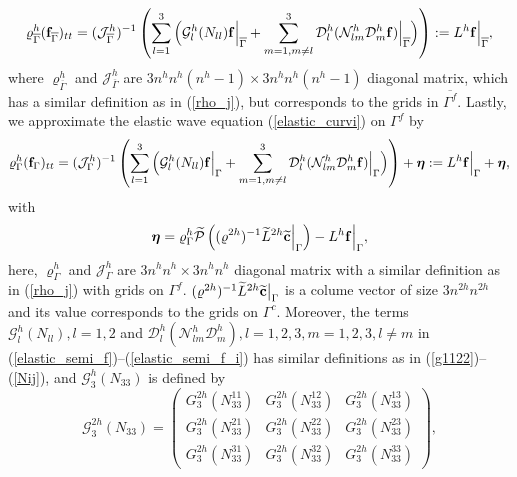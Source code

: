 \begin{equation}\label{elastic_semi_f}
\varrho^h_{\overline{\Gamma}} ({\bf f}_{\overline{\Gamma}})_{tt} =
( \mathcal{ J}_{\overline{\Gamma}}^{h})^{-1}\left(\sum_{l=1}^3\Big(\mathcal{G}_l^{h}({N}_{ll}){\bf f}\Big|_{\overline{\Gamma}}+\sum_{m=1,m\neq l}^3\mathcal{D}_l^{h}(\mathcal{N}_{lm}^{h}\mathcal{D}_m^{h}{\bf f})\Big|_{\overline{\Gamma}}\Big)\right) := L^h{\bf f}\Big|_{\overline{\Gamma}},
\end{equation}
where ${\varrho}^{h}_{\overline{\Gamma}}$ and ${\mathcal{J}}^{h}_{\overline{\Gamma}}$ are $3n^hn^h(n^h-1)\times 3n^hn^h(n^h-1)$ diagonal matrix, which has a similar definition as in (\ref{rho_j}), but corresponds to the grids in $\overline{\Gamma^f}$. Lastly, we approximate the elastic wave equation (\ref{elastic_curvi}) on $\Gamma^f$ by
\begin{equation}\label{elastic_semi_f_i}
{\varrho}^h_\Gamma ({\bf f}_\Gamma)_{tt} =
( {\mathcal{ J}}^{h}_\Gamma)^{-1}\left(\sum_{l=1}^3\Big(\mathcal{G}_l^{h}({N}_{ll}){\bf f}\Big|_\Gamma+\sum_{m=1,m\neq l}^3\mathcal{D}_l^{h}(\mathcal{N}_{lm}^{h}\mathcal{D}_m^{h}{\bf f})\Big|_\Gamma\Big) \right) + {\bm \eta} := L^h{\bf f}\Big|_\Gamma + {\bm \eta},
\end{equation}
with 
\begin{equation}\label{eta}
{\bm \eta} = {\varrho}^h_{\Gamma}\wt{\mathcal{P}}\left(({ \varrho}^{2h})^{-1}\wt{L}^{2h} \wt{{\bf c}}\Big|_{\Gamma}\right) - L^{h}{\bf f}\Big|_{\Gamma},
\end{equation}
here, ${\varrho}^{h}_{\Gamma}$ and ${\mathcal{ J}}^{h}_{\Gamma}$ are $3n^hn^h\times 3n^hn^h$ diagonal matrix with a similar definition as in (\ref{rho_j}) with grids on $\Gamma^f$. $({\varrho}^{2h})^{-1}\widetilde{L}^{2h} \widetilde{{\bf c}}\big|_{\Gamma}$ is a colume vector of size $3n^{2h} n^{2h}$ and its value corresponds to the grids on $\Gamma^c$. Moreover, the terms $\mathcal{G}_l^h({N}_{ll}), l = 1,2$ and $\mathcal{D}_l^h(\mathcal{N}_{lm}^h\mathcal{D}_m^h), l=1,2,3,m=1,2,3,l\neq m$ in (\ref{elastic_semi_f})--(\ref{elastic_semi_f_i}) has similar definitions as in (\ref{g1122})--(\ref{Nij}), and $\mathcal{G}_3^h({N}_{33})$ is defined by
\[ \mathcal{G}^{2h}_3({N}_{33}) = \left(\begin{array}{ccc}
G_3^{2h}(N_{33}^{11}) & G_3^{2h}(N_{33}^{12})  & G_3^{2h}(N_{33}^{13}) \\
G_3^{2h}(N_{33}^{21}) & G_3^{2h}(N_{33}^{22})  & G_3^{2h}(N_{33}^{23}) \\
G_3^{2h}(N_{33}^{31}) & G_3^{2h}(N_{33}^{32})  & G_3^{2h}(N_{33}^{33}) \end{array}\right),\]
